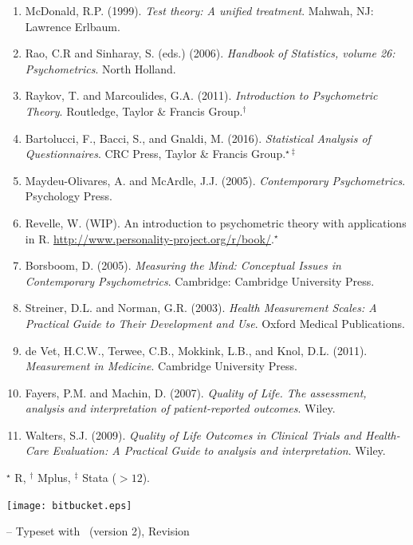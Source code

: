 \begin{enumerate}
\item McDonald, R.P. (1999). \emph{Test theory: A unified treatment}. Mahwah,
  NJ: Lawrence Erlbaum.
\item Rao, C.R and Sinharay, S. (eds.) (2006). \emph{Handbook of Statistics,
    volume 26: Psychometrics}. North Holland.
\item Raykov, T. and Marcoulides, G.A. (2011). \emph{Introduction to
    Psychometric Theory}. Routledge, Taylor \& Francis Group.$^\dagger$
\item Bartolucci, F., Bacci, S., and Gnaldi, M. (2016). \emph{Statistical Analysis of
  Questionnaires}. CRC Press, Taylor \& Francis Group.$^{\star\ddagger}$
\item Maydeu-Olivares, A. and McArdle, J.J. (2005). \emph{Contemporary
    Psychometrics}. Psychology Press.
\item Revelle, W. (WIP). An introduction to psychometric theory with
  applications in R. \url{http://www.personality-project.org/r/book/}.$^\star$
\item Borsboom, D. (2005). \emph{Measuring the Mind: Conceptual Issues in
    Contemporary Psychometrics}. Cambridge: Cambridge University Press.
\item Streiner, D.L. and Norman, G.R. (2003). \emph{Health Measurement Scales: A
    Practical Guide to Their Development and Use}. Oxford Medical Publications.
\item de Vet, H.C.W., Terwee, C.B., Mokkink, L.B., and Knol, D.L. (2011).
  \emph{Measurement in Medicine}. Cambridge University Press.
\item Fayers, P.M. and Machin, D. (2007). \emph{Quality of Life. The assessment,
  analysis and interpretation of patient-reported outcomes}. Wiley.
\item Walters, S.J. (2009). \emph{Quality of Life Outcomes in Clinical Trials
    and Health-Care Evaluation: A Practical Guide to analysis and
    interpretation}. Wiley.
\end{enumerate}

{\small $^\star$ R, $^\dagger$ Mplus, $^\ddagger$ Stata ($>12$).}


{\centering \texttt{[image: bitbucket.eps]}\par}


\raggedleft \scriptsize -- Typeset with \FoilTeX\ (version 2), Revision \VCRevision






